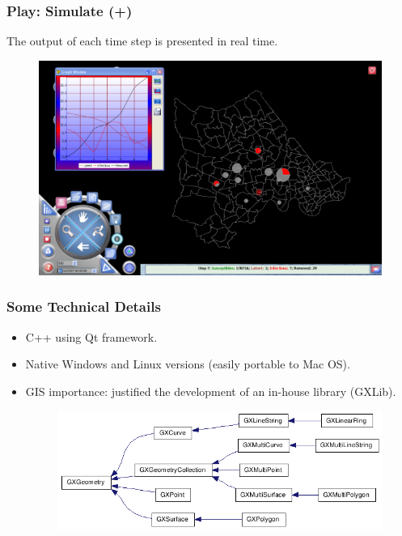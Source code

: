 \documentclass[hyperref={pdfpagelabels=true}]{beamer}
\begin{document}
\begin{frame}
\frametitle{Play: Simulate (+)}
The output of each time step is presented in real time.
\begin{figure}
\includegraphics[scale=0.4]{winScreen.png}
\end{figure}
\end{frame}

\begin{frame}
\frametitle{Some Technical Details}
\begin{itemize}
\item C++ using Qt framework.
\item Native Windows and Linux versions (easily portable to Mac OS).
\item GIS importance: justified the development of an in-house library (GXLib).
\begin{figure}
\includegraphics[scale=0.25]{inherit__graph__14.png}
\end{figure}
\end{itemize}
\end{frame}
\end{document}
